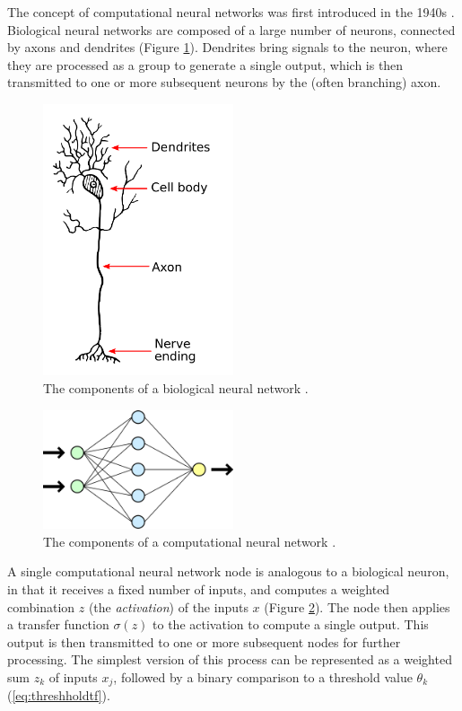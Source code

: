\documentclass{article}
\begin{document}
The concept of computational neural networks was first introduced in the 1940s \cite{McCulloch1943}. Biological neural networks are composed of a large number of neurons, connected by axons and dendrites (Figure \ref{fig:BioNN}). Dendrites bring signals to the neuron, where they are processed as a group to generate a single output, which is then transmitted to  one or more subsequent neurons by the (often branching) axon.

\begin{figure}
  \centering
  \includegraphics[width=0.5\textwidth]{Dendrite.png}
  \caption{The components of a biological neural network \cite{bionn}.}
  \label{fig:BioNN}
\end{figure}

\begin{figure}
  \centering
  \includegraphics[width=0.5\textwidth]{NeuralNetwork.png}
  \caption{The components of a computational neural network \cite{compnn}.}
  \label{fig:CompNN}
\end{figure}

A single computational neural network node is analogous to a biological neuron, in that it receives a fixed number of inputs, and computes a weighted combination $z$ (the \emph{activation}) of the inputs $x$ (Figure \ref{fig:CompNN}). The node then applies a transfer function $\sigma(z)$ to the activation to compute a single output. This output is then transmitted to one or more subsequent nodes for further processing. The simplest version of this process can be represented as a weighted sum $z_k$ of inputs $x_j$, followed by a binary comparison to a threshold value $\theta_k$ (\ref{eq:threshholdtf}).
\end{document}

